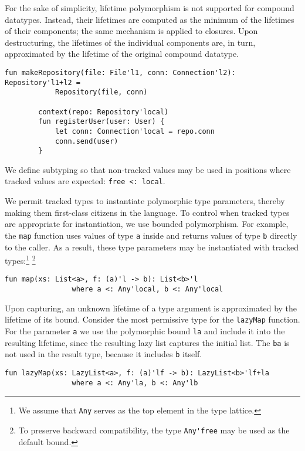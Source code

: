 \documentclass[11pt]{article}
\begin{document}
    For the sake of simplicity, lifetime polymorphism is not supported for compound datatypes.
    Instead, their lifetimes are computed as the minimum of the lifetimes of their components; the same mechanism is applied to closures.
    Upon destructuring, the lifetimes of the individual components are, in turn, approximated by the lifetime of the original compound datatype.
    \begin{lstlisting}[language=colang]
        fun makeRepository(file: File'l1, conn: Connection'l2): Repository'l1+l2 =
            Repository(file, conn)

        context(repo: Repository'local)
        fun registerUser(user: User) {
            let conn: Connection'local = repo.conn
            conn.send(user)
        }
    \end{lstlisting}

    We define subtyping so that non-tracked values may be used in positions where tracked values are expected: \lstinline[language=colang]|free <: local|. %

    We permit tracked types to instantiate polymorphic type parameters, thereby making them first-class citizens in the language.
    To control when tracked types are appropriate for instantiation, we use bounded polymorphism.
    For example, the \lstinline[language=colang]|map| function uses values of type \lstinline[language=colang]|a| inside and returns values of type \lstinline[language=colang]|b| directly to the caller.
    As a result, these type parameters may be instantiated with tracked types:\footnote{We assume that \lstinline[language=colang]|Any| serves as the top element in the type lattice.} \footnote{To preserve backward compatibility, the type \lstinline[language=colang]|Any'free| may be used as the default bound.}
    \begin{lstlisting}[language=colang]
        fun map(xs: List<a>, f: (a)'l -> b): List<b>'l
                where a <: Any'local, b <: Any'local
    \end{lstlisting}

    Upon capturing, an unknown lifetime of a type argument is approximated by the lifetime of its bound.
    Consider the most permissive type for the \lstinline[language=colang]|lazyMap| function.
    For the parameter \lstinline[language=colang]|a| we use the polymorphic bound \lstinline[language=colang]|la| and include it into the resulting lifetime, since the resulting lazy list captures the initial list.
    The \lstinline[language=colang]|ba| is not used in the result type, because it includes \lstinline[language=colang]|b| itself.
    \begin{lstlisting}[language=colang]
        fun lazyMap(xs: LazyList<a>, f: (a)'lf -> b): LazyList<b>'lf+la
                where a <: Any'la, b <: Any'lb
    \end{lstlisting}
\end{document}
